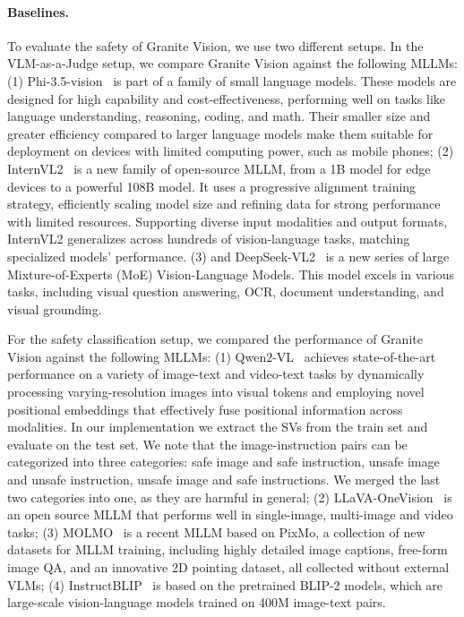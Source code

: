 \paragraph{Baselines.} To evaluate the safety of Granite Vision, we use two different setups. In the VLM-as-a-Judge setup, we compare Granite Vision against the following MLLMs: (1) Phi-3.5-vision~\citep{abdin2024phi} is part of a family of small language models. These models are designed for high capability and cost-effectiveness, performing well on tasks like language understanding, reasoning, coding, and math. Their smaller size and greater efficiency compared to larger language models make them suitable for deployment on devices with limited computing power, such as mobile phones; (2) InternVL2~\citep{chen2024internvl} is a new family of open-source MLLM, from a 1B model for edge devices to a powerful 108B model. It uses a progressive alignment training strategy, efficiently scaling model size and refining data for strong performance with limited resources. Supporting diverse input modalities and output formats, InternVL2 generalizes across hundreds of vision-language tasks, matching specialized models' performance. (3) and DeepSeek-VL2~\citep{wu2024deepseekvl2} is a new series of large Mixture-of-Experts (MoE) Vision-Language Models. This model excels in various tasks, including visual question answering, OCR, document understanding, and visual grounding.



For the safety classification setup, we compared the performance of Granite Vision against the following MLLMs: (1) Qwen2-VL~\citep{wang2024qwen2} achieves state-of-the-art performance on a variety of image-text and video-text tasks by dynamically processing varying-resolution images into visual tokens and employing novel positional embeddings that effectively fuse positional information across modalities. In our implementation we extract the SVs from the train set and evaluate on the test set. We note that the image-instruction pairs can be categorized into three categories: safe image and safe instruction, unsafe image and unsafe instruction, unsafe image and safe instructions. We merged the last two categories into one, as they are harmful in general; (2) LLaVA-OneVision~\citep{Li2024LLaVAOneVisionEV} is an open source MLLM that performs well in single-image, multi-image and video tasks;  (3) MOLMO~\citep{molmo} is a recent MLLM based on PixMo, a collection of new datasets for MLLM training, including highly detailed image captions, free-form image QA, and an innovative 2D pointing dataset, all collected without external VLMs; (4) InstructBLIP~\citep{dai2023instructblip} is based on the pretrained BLIP-2 models, which are large-scale vision-language models trained on 400M image-text pairs.


